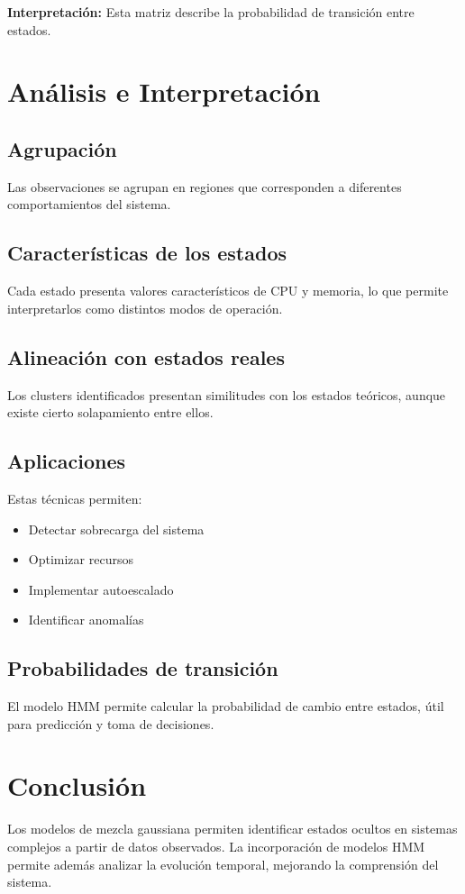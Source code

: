 \documentclass[12pt]{article}
\begin{document}
\textbf{Interpretación:} Esta matriz describe la probabilidad de transición entre estados.

\section{Análisis e Interpretación}

\subsection{Agrupación}
Las observaciones se agrupan en regiones que corresponden a diferentes comportamientos del sistema.

\subsection{Características de los estados}
Cada estado presenta valores característicos de CPU y memoria, lo que permite interpretarlos como distintos modos de operación.

\subsection{Alineación con estados reales}
Los clusters identificados presentan similitudes con los estados teóricos, aunque existe cierto solapamiento entre ellos.

\subsection{Aplicaciones}
Estas técnicas permiten:

\begin{itemize}
\item Detectar sobrecarga del sistema
\item Optimizar recursos
\item Implementar autoescalado
\item Identificar anomalías
\end{itemize}

\subsection{Probabilidades de transición}
El modelo HMM permite calcular la probabilidad de cambio entre estados, útil para predicción y toma de decisiones.

\section{Conclusión}

Los modelos de mezcla gaussiana permiten identificar estados ocultos en sistemas complejos a partir de datos observados. La incorporación de modelos HMM permite además analizar la evolución temporal, mejorando la comprensión del sistema.
\end{document}
